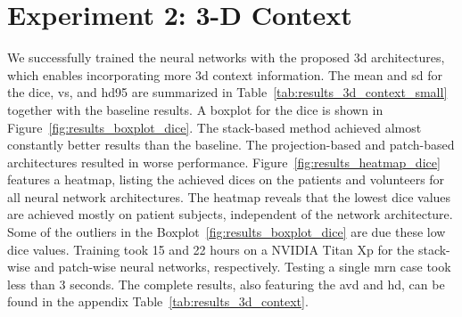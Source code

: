 \section{Experiment 2: 3-D Context} \label{sec:exp_3dcontext} %
We successfully trained the neural networks with the proposed \gls{3d} architectures, which enables incorporating more \gls{3d} context information. The mean and \gls{sd} for the \acrlong{dice}, \acrlong{vs}, and \acrlong{hd95} are summarized in Table~\ref{tab:results_3d_context_small} together with the baseline results. A boxplot for the \acrlong{dice} is shown in Figure~\ref{fig:results_boxplot_dice}. The stack-based method achieved almost constantly better results than the baseline. The projection-based and patch-based architectures resulted in worse performance. Figure~\ref{fig:results_heatmap_dice} features a heatmap, listing the achieved \acrlong{dice}s on the patients and volunteers for all neural network architectures. The heatmap reveals that the lowest \gls{dice} values are achieved mostly on patient subjects, independent of the network architecture. Some of the outliers in the Boxplot~\ref{fig:results_boxplot_dice} are due these low \gls{dice} values. Training took 15 and 22 hours on a NVIDIA Titan Xp for the stack-wise and patch-wise neural networks, respectively. Testing a single \gls{mrn} case took less than 3 seconds. The complete results, also featuring the \acrlong{avd} and \acrlong{hd}, can be found in the appendix Table~\ref{tab:results_3d_context}.

